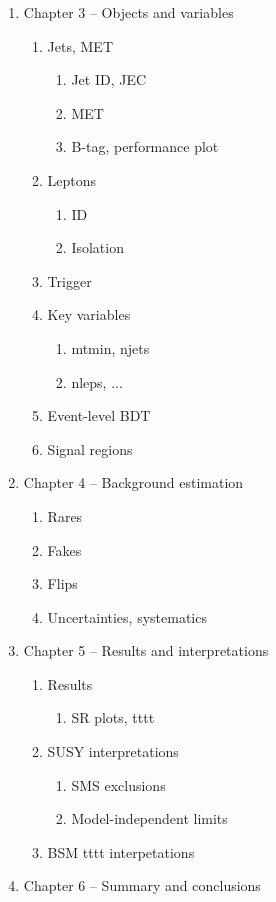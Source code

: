\begin{enumerate}
	\item Chapter 3 -- Objects and variables
    \begin{enumerate}
    	\item Jets, MET
        \begin{enumerate}
            \item Jet ID, JEC
            \item MET
            \item B-tag, performance plot
        \end{enumerate}
    	\item Leptons
        \begin{enumerate}
            \item ID
            \item Isolation
        \end{enumerate}
    	\item Trigger
    	\item Key variables
        \begin{enumerate}
            \item mtmin, njets
            \item nleps, ...
        \end{enumerate}
    	\item Event-level BDT
    	\item Signal regions
    \end{enumerate}


	\item Chapter 4 -- Background estimation
    \begin{enumerate}
    	\item Rares
    	\item Fakes
    	\item Flips
    	\item Uncertainties, systematics
    \end{enumerate}

	\item Chapter 5 -- Results and interpretations
    \begin{enumerate}
    	\item Results
        \begin{enumerate}
            \item SR plots, tttt
        \end{enumerate}
    	\item SUSY interpretations
        \begin{enumerate}
            \item SMS exclusions
            \item Model-independent limits
        \end{enumerate}
    	\item BSM tttt interpetations

    \end{enumerate}


	\item Chapter 6 -- Summary and conclusions

\end{enumerate}
